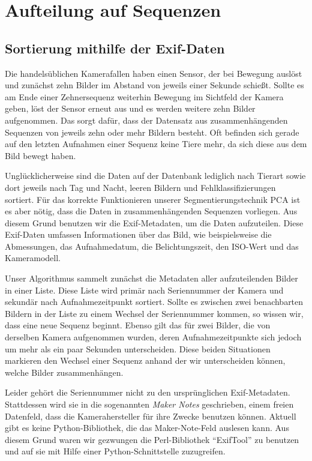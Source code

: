 \section{Aufteilung auf Sequenzen}

\subsection{Sortierung mithilfe der Exif-Daten}

Die handelsüblichen Kamerafallen haben einen Sensor, der bei Bewegung auslöst und zunächst zehn Bilder im Abstand von jeweils einer Sekunde schießt. Sollte es am Ende einer Zehnersequenz weiterhin Bewegung im Sichtfeld der Kamera geben, löst der Sensor erneut aus und es werden weitere zehn Bilder aufgenommen. Das sorgt dafür, dass der Datensatz aus zusammenhängenden Sequenzen von jeweils zehn oder mehr Bildern besteht. Oft befinden sich gerade auf den letzten Aufnahmen einer Sequenz keine Tiere mehr, da sich diese aus dem Bild bewegt haben. 

Unglücklicherweise sind die Daten auf der Datenbank lediglich nach Tierart sowie dort jeweils nach Tag und Nacht, leeren Bildern und Fehlklassifizierungen sortiert. Für das korrekte Funktionieren unserer Segmentierungstechnik PCA ist es aber nötig, dass die Daten in zusammenhängenden Sequenzen vorliegen. Aus diesem Grund benutzen wir die Exif-Metadaten, um die Daten aufzuteilen. Diese Exif-Daten umfassen Informationen über das Bild, wie beispielsweise die Abmessungen, das Aufnahmedatum, die Belichtungszeit, den ISO-Wert und das Kameramodell.

Unser Algorithmus sammelt zunächst die Metadaten aller aufzuteilenden Bilder in einer Liste. Diese Liste wird primär nach Seriennummer der Kamera und sekundär nach Aufnahmezeitpunkt sortiert. Sollte es zwischen zwei benachbarten Bildern in der Liste zu einem Wechsel der Seriennummer kommen, so wissen wir, dass eine neue Sequenz beginnt. Ebenso gilt das für zwei Bilder, die von derselben Kamera aufgenommen wurden, deren Aufnahmezeitpunkte sich jedoch um mehr als ein paar Sekunden unterscheiden. Diese beiden Situationen markieren den Wechsel einer Sequenz anhand der wir unterscheiden können, welche Bilder zusammenhängen.

Leider gehört die Seriennummer nicht zu den ursprünglichen Exif-Metadaten. Stattdessen wird sie in die sogenannten \emph{Maker Notes} geschrieben, einem freien Datenfeld, dass die Kamerahersteller für ihre Zwecke benutzen können. Aktuell gibt es keine Python-Bibliothek, die das Maker-Note-Feld auslesen kann. Aus diesem Grund waren wir gezwungen die Perl-Bibliothek \enquote{ExifTool} \cite{exif} zu benutzen und auf sie mit Hilfe einer Python-Schnittstelle zuzugreifen.

